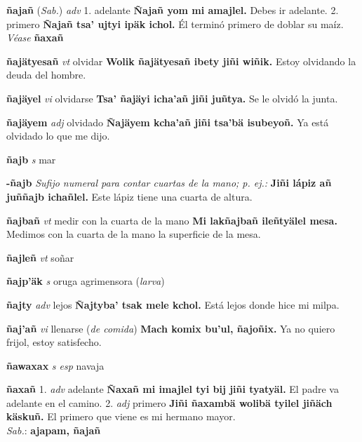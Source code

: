 \documentclass[10pt]{scrbook}
\newcommand{\entry}[1]{\textbf{#1}}
\newcommand{\onedefinition}[1]{#1.}
\newcommand{\nontranslationdef}[1]{\textit{#1}}
\newcommand{\partofspeech}[1]{\textit{#1}}
\newcommand{\spanishtranslation}[1]{#1}
\newcommand{\clarification}[1]{(\textit{#1})}
\newcommand{\cholexample}[1]{\textbf{#1}}
\newcommand{\exampletranslation}[1]{#1}
\newcommand{\dialectvariant}[1]{\\\textit{#1}:}
\newcommand{\dialectword}[1]{\textbf{#1}}
\newcommand{\alsosee}[1]{\\\textit{Véase} \textbf{#1}}
\newcommand{\relevantdialect}[1]{(\textit{#1})}
\begin{document}
\begin{multicols}{2}
\entry{ñajañ}
\relevantdialect{Sab.}
\partofspeech{adv}
\onedefinition{1}
\spanishtranslation{adelante}
\cholexample{Ñajañ yom mi amajlel.}
\exampletranslation{Debes ir adelante.}
\onedefinition{2}
\spanishtranslation{primero}
\cholexample{Ñajañ tsa' ujtyi ipäk ichol.}
\exampletranslation{Él terminó primero de doblar su maíz.}
\alsosee{ñaxañ}

\entry{ñajätyesañ}
\partofspeech{vt}
\spanishtranslation{olvidar}
\cholexample{Wolik ñajätyesañ ibety jiñi wiñik.}
\exampletranslation{Estoy olvidando la deuda del hombre.}

\entry{ñajäyel}
\partofspeech{vi}
\spanishtranslation{olvidarse}
\cholexample{Tsa' ñajäyi icha'añ jiñi juñtya.}
\exampletranslation{Se le olvidó la junta.}

\entry{ñajäyem}
\partofspeech{adj}
\spanishtranslation{olvidado}
\cholexample{Ñajäyem kcha'añ jiñi tsa'bä isubeyoñ.}
\exampletranslation{Ya está olvidado lo que me dijo.}

\entry{ñajb}
\partofspeech{s}
\spanishtranslation{mar}

\entry{-ñajb}
\nontranslationdef{Sufijo numeral para contar cuartas de la mano; p. ej.:}
\cholexample{Jiñi lápiz añ juññajb ichañlel.}
\exampletranslation{Este lápiz tiene una cuarta de altura.}

\entry{ñajbañ}
\partofspeech{vt}
\spanishtranslation{medir con la cuarta de la mano}
\cholexample{Mi lakñajbañ ileñtyälel mesa.}
\exampletranslation{Medimos con la cuarta de la mano la superficie de la mesa.}

\entry{ñajleñ}
\partofspeech{vt}
\spanishtranslation{soñar}

\entry{ñajp'äk}
\partofspeech{s}
\spanishtranslation{oruga agrimensora}
\clarification{larva}

\entry{ñajty}
\partofspeech{adv}
\spanishtranslation{lejos}
\cholexample{Ñajtyba' tsak mele kchol.}
\exampletranslation{Está lejos donde hice mi milpa.}

\entry{ñaj'añ}
\partofspeech{vi}
\spanishtranslation{llenarse}
\clarification{de comida}
\cholexample{Mach komix bu'ul, ñajoñix.}
\exampletranslation{Ya no quiero frijol, estoy satisfecho.}

\entry{ñawaxax}
\partofspeech{s esp}
\spanishtranslation{navaja}

\entry{ñaxañ}
\onedefinition{1}
\partofspeech{adv}
\spanishtranslation{adelante}
\cholexample{Ñaxañ mi imajlel tyi bij jiñi tyatyäl.}
\exampletranslation{El padre va adelante en el camino.}
\onedefinition{2}
\partofspeech{adj}
\spanishtranslation{primero}
\cholexample{Jiñi ñaxambä wolibä tyilel jiñäch käskuñ.}
\exampletranslation{El primero que viene es mi hermano mayor.}
\dialectvariant{Sab.}
\dialectword{ajapam, ñajañ}


\end{multicols}
\end{document}
